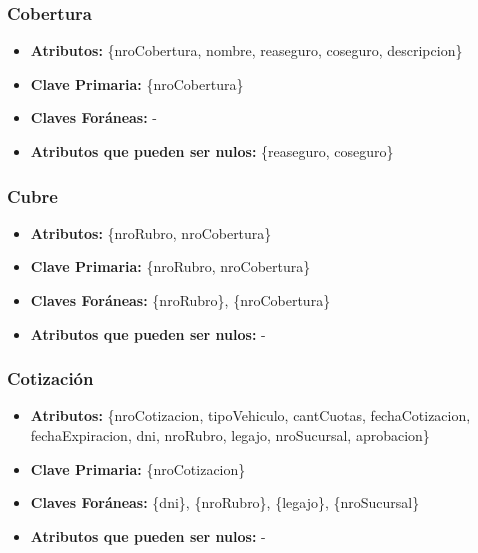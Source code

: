 \documentclass[a4paper,11pt]{article}
\begin{document}
\subsubsection{Cobertura}

\begin{itemize}

	\item \textbf{Atributos:} \{nroCobertura, nombre, reaseguro, coseguro, descripcion\}

	\item \textbf{Clave Primaria:} \{nroCobertura\}
	
	\item \textbf{Claves Foráneas:} -

	\item \textbf{Atributos que pueden ser nulos:} \{reaseguro, coseguro\} 
	
\end{itemize}

\subsubsection{Cubre}

\begin{itemize}

	\item \textbf{Atributos:} \{nroRubro, nroCobertura\}

	\item \textbf{Clave Primaria:} \{nroRubro, nroCobertura\}
	
	\item \textbf{Claves Foráneas:} \{nroRubro\}, \{nroCobertura\}

	\item \textbf{Atributos que pueden ser nulos:} -
	
\end{itemize}


\subsubsection{Cotización}

\begin{itemize}

	\item \textbf{Atributos:} \{nroCotizacion, tipoVehiculo, cantCuotas, fechaCotizacion, fechaExpiracion, dni, nroRubro, legajo, nroSucursal, aprobacion\}
	
	\item \textbf{Clave Primaria:} \{nroCotizacion\}
	
	\item \textbf{Claves Foráneas:} \{dni\}, \{nroRubro\}, \{legajo\}, \{nroSucursal\}

	\item \textbf{Atributos que pueden ser nulos:} -
	
\end{itemize}
\end{document}
